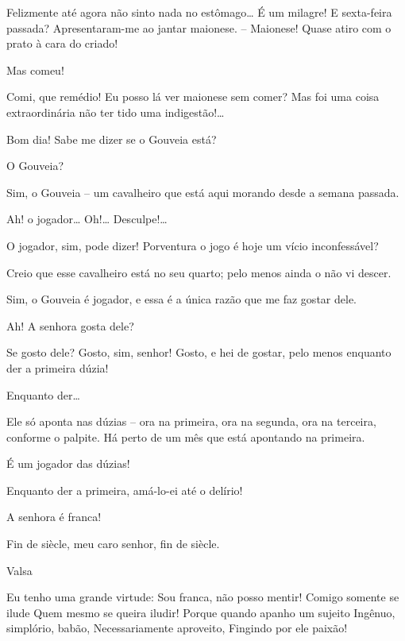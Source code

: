  Felizmente até agora não sinto nada no estômago\ldots{} É um
milagre! E sexta-feira passada? Apresentaram-me ao jantar maionese. -- Maionese! Quase
atiro com o prato à cara do criado!

 Mas comeu!

 Comi, que remédio! Eu posso lá ver maionese sem comer? Mas foi
uma coisa extraordinária não ter tido uma indigestão!\ldots{}


  Bom dia!  Sabe
me dizer se o Gouveia está?

 O Gouveia?

 Sim, o Gouveia -- um cavalheiro que está aqui morando desde a semana
passada.

  Ah! o jogador\ldots{}  Oh!\ldots{}
Desculpe!\ldots{}

 O jogador, sim, pode dizer! Porventura o jogo é hoje um vício
inconfessável?

 Creio que esse cavalheiro está no seu quarto; pelo menos ainda
o não vi descer.

 Sim, o Gouveia é jogador, e essa é a única razão que me faz gostar
dele.

 Ah! A senhora gosta dele?

 Se gosto dele? Gosto, sim, senhor! Gosto, e hei de gostar, pelo
menos enquanto der a primeira dúzia!

  Enquanto der\ldots{}

 Ele só aponta nas dúzias -- ora na primeira, ora na segunda, ora na
terceira, conforme o palpite. Há perto de um mês que está apontando na
primeira.

  É um jogador das dúzias!

 Enquanto der a primeira, amá-lo-ei até o delírio!

 A senhora é franca!

 Fin de siècle, meu caro senhor, fin de siècle.

 Valsa

 Eu tenho uma grande virtude:
 Sou franca, não posso mentir!
 Comigo somente se ilude
 Quem mesmo se queira iludir!
 Porque quando apanho um sujeito
 Ingênuo, simplório, babão,
 Necessariamente aproveito,
 Fingindo por ele paixão!
 
